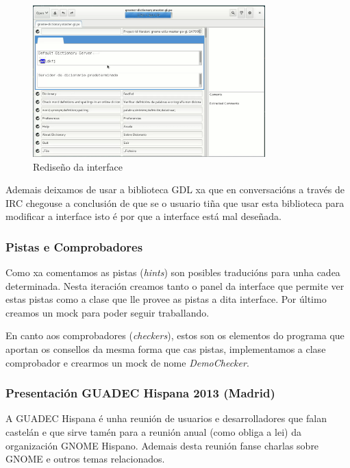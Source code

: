 \begin{figure}[h!]
    \centering
    \includegraphics[width=0.8\textwidth]{img/curso2014_it1_ui.png} 
    \caption{Rediseño da interface}
    \label{fig:curso2014_it1_ui}
\end{figure}

Ademais deixamos de usar a biblioteca GDL xa que en conversacións a través de IRC chegouse a conclusión de que se o usuario tiña que usar esta biblioteca para modificar a interface isto é por que a interface está mal deseñada.


\subsubsection{Pistas e Comprobadores}
Como xa comentamos as pistas (\emph{hints}) son posibles traducións para unha cadea determinada. Nesta iteración creamos tanto o panel da interface que permite ver estas pistas como a clase que lle provee as pistas a dita interface. Por último creamos un mock para poder seguir traballando.

En canto aos comprobadores (\emph{checkers}), estos son os elementos do programa que aportan os consellos da mesma forma que cas pistas, implementamos a clase comprobador e crearmos un mock de nome \emph{DemoChecker}.

\subsubsection{Presentación GUADEC Hispana 2013 (Madrid)}

A GUADEC Hispana é unha reunión de usuarios e desarrolladores que falan castelán e que sirve tamén para a reunión anual (como obliga a lei) da organización GNOME Hispano. Ademais desta reunión fanse charlas sobre GNOME e outros temas relacionados.

